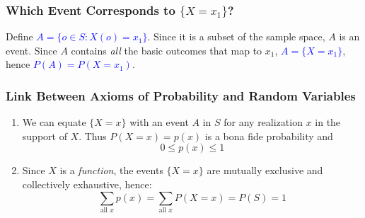 \documentclass[handout]{beamer}
\begin{document}
\begin{frame}
\frametitle{Which Event Corresponds to $\{X=x_1\}$?}

\begin{figure}
	\centering
{}
\end{figure}



Define \textcolor{blue}{$A = \{o \in S \colon X(o) = x_1\}$}. Since it is a subset of the sample space, $A$ is an event. Since $A$ contains \emph{all} the basic outcomes that map to $x_1$, \textcolor{blue}{$A = \{X=x_1\}$}, hence \textcolor{blue}{$P(A) = P(X=x_1)$}.


\end{frame}
\begin{frame}
	\frametitle{Link Between Axioms of Probability and Random Variables}

	\begin{enumerate}
		\item We can equate $\{X=x\}$ with an event $A$ in $S$ for any realization $x$ in the support of $X$. Thus $P(X=x) = p(x)$ is a bona fide probability and
				$$0 \leq p(x) \leq 1$$
		\item Since $X$ is a \emph{function}, the events $\{X= x\}$ are \alert{mutually exclusive} and \alert{collectively exhaustive}, hence:
		$$\sum_{\mbox{all } x} p(x) = \sum_{\mbox{all } x} P(X=x) = P(S) = 1$$
	\end{enumerate}

\end{frame}
\end{document}
